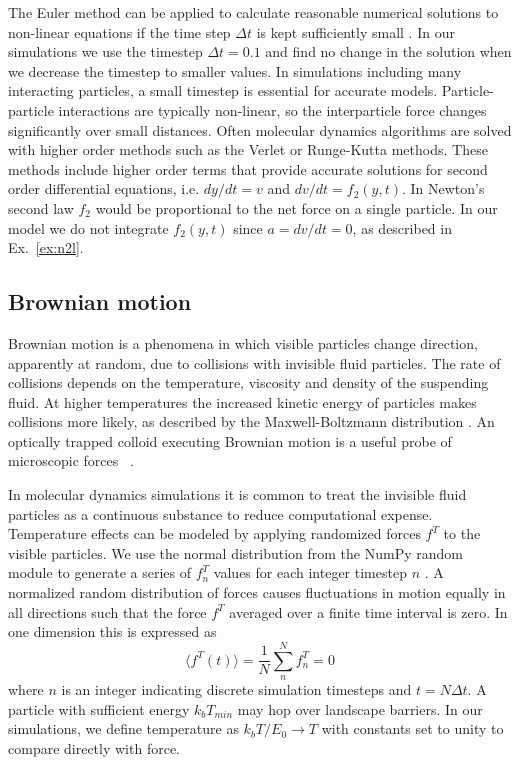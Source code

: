 \documentclass[twocolumn,showpacs,preprintnumbers,amsmath,amssymb,aps,prb]{revtex4}
\begin{document}
  The Euler method can be applied to
  calculate reasonable numerical solutions to 
  non-linear
  equations if the time step $\Delta t$
  is kept sufficiently small \cite{Newman}.
  In our simulations we use the timestep $\Delta t = 0.1$
  and find no change in the solution
  when we decrease the timestep to smaller values.
  In simulations
  including many interacting particles,
  a small
  timestep is essential for accurate models.
  Particle-particle interactions are typically non-linear,
  so the interparticle force changes significantly over small distances.
  Often molecular dynamics algorithms 
  are solved with higher order methods
  such as the Verlet or Runge-Kutta methods.
  These methods include  higher order terms
  that provide accurate solutions for
  second order differential equations,
  i.e. $dy/dt = v$ and $dv/dt = f_2(y,t)$.
  In Newton's second law $f_2$ would be proportional
  to the net force on a single particle.
  In our model 
  we do not integrate $f_2(y,t)$ since 
  $a = dv/dt = 0$,
  as described in Ex.~\ref{ex:n2l}.
  
  \subsection{Brownian motion}
  \label{ex:brownian}
  Brownian motion is a phenomena in which 
  visible particles change direction,
  apparently at random, 
  due to collisions with invisible fluid particles.
  The rate of collisions depends on the temperature, viscosity
  and density of 
  the suspending fluid.
  At higher temperatures
  the increased kinetic energy of particles
  makes collisions more likely, 
  as described by the Maxwell-Boltzmann distribution \cite{Einstein1905}.
  An optically trapped colloid executing Brownian motion
  is a useful probe of microscopic forces ~\cite{Volpe2013}.
  
  In molecular dynamics simulations
  it is common to treat the 
  invisible fluid particles as a continuous substance
  to reduce computational expense.
  Temperature effects
  can be modeled by applying randomized forces $f^T$
  to the visible particles.
  We use the normal distribution from the NumPy random module
  to generate a series of $f^T_n$ values for
  each integer timestep $n$ \cite{numpy}.
  A normalized random distribution of forces
  causes fluctuations in 
  motion 
  equally in all
  directions such that the force $f^T$
  averaged over a finite time interval
  is zero.  In one dimension this is expressed as 
  \begin{equation}
    \langle f^T(t) \rangle = \frac{1}{N} \sum_n^N f^T_n = 0
  \end{equation}
  where $n$ is an integer indicating
  discrete simulation timesteps and 
  $t = N \Delta t$.
  A particle
  with sufficient energy $k_b T_{min}$ may 
  hop over landscape
  barriers.
  In our simulations,
  we define temperature as 
  $k_b T/E_0 \rightarrow T$
  with constants set to unity
  to
  compare directly with force. 
 
\end{document}
